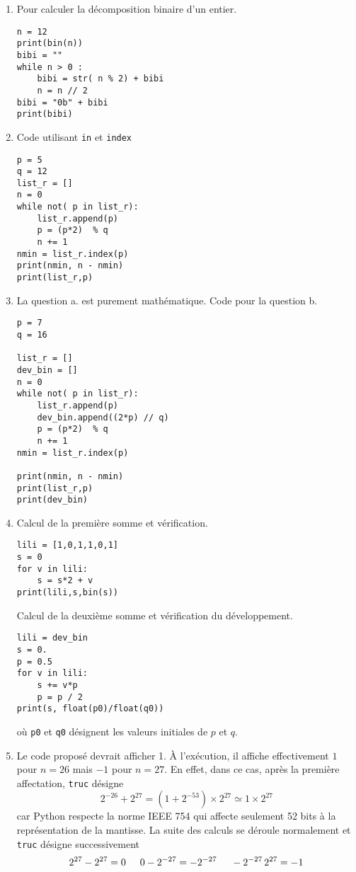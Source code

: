 \begin{enumerate}
  \item Pour calculer la décomposition binaire d'un entier.
\begin{verbatim}
n = 12
print(bin(n))
bibi = ""
while n > 0 :
    bibi = str( n % 2) + bibi
    n = n // 2
bibi = "0b" + bibi
print(bibi)
\end{verbatim}

 \item Code utilisant \texttt{in} et \texttt{index}
\begin{verbatim}p = 5
q = 12
list_r = []
n = 0
while not( p in list_r):
    list_r.append(p)
    p = (p*2)  % q
    n += 1
nmin = list_r.index(p)
print(nmin, n - nmin)
print(list_r,p)\end{verbatim}

\item La question a. est purement mathématique. Code pour la question b.
\begin{verbatim}p = 7
q = 16

list_r = []
dev_bin = []
n = 0
while not( p in list_r):
    list_r.append(p)
    dev_bin.append((2*p) // q)
    p = (p*2)  % q
    n += 1
nmin = list_r.index(p)

print(nmin, n - nmin)
print(list_r,p)
print(dev_bin)\end{verbatim}

\item Calcul de la première somme et vérification.
\begin{verbatim}lili = [1,0,1,1,0,1]
s = 0
for v in lili:
    s = s*2 + v
print(lili,s,bin(s))\end{verbatim}


Calcul de la deuxième somme et vérification du développement.
\begin{verbatim}
lili = dev_bin
s = 0.
p = 0.5
for v in lili:
    s += v*p
    p = p / 2
print(s, float(p0)/float(q0))
\end{verbatim}
où \texttt{p0} et \texttt{q0} désignent les valeurs initiales de $p$ et $q$.

\item Le code proposé devrait afficher 1. \`A l'exécution, il affiche effectivement $1$ pour $n=26$ mais $-1$ pour $n=27$.\newline
En effet, dans ce cas, après la première affectation, \texttt{truc} désigne
\begin{displaymath}
  2^{-26} + 2^{27} = (1 + 2^{-53})\times 2^{27} \simeq 1 \times 2^{27}
\end{displaymath}
car Python respecte la norme IEEE 754 qui affecte seulement 52 bits à la représentation de la mantisse. La suite des calculs se déroule normalement et \texttt{truc} désigne successivement
\begin{displaymath}
  2^{27}-2^{27}=0\hspace{0.5cm} 0-2^{-27} = -2^{-27}
  \hspace{0.5cm} -2^{-27}\,2^{27} = -1
\end{displaymath}


\end{enumerate}
